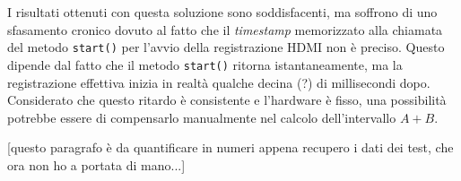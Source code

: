 I risultati ottenuti con questa soluzione sono soddisfacenti, ma soffrono di uno sfasamento cronico dovuto al fatto che il \emph{timestamp} memorizzato alla chiamata del metodo \texttt{start()} per l'avvio della registrazione HDMI non è preciso. Questo dipende dal fatto che il metodo \texttt{start()} ritorna istantaneamente, ma la registrazione effettiva inizia in realtà qualche decina (?) di millisecondi dopo. Considerato che questo ritardo è consistente e l'hardware è fisso, una possibilità potrebbe essere di compensarlo manualmente nel calcolo dell'intervallo $A+B$.

[questo paragrafo è da quantificare in numeri appena recupero i dati dei test, che ora non ho a portata di mano...]

